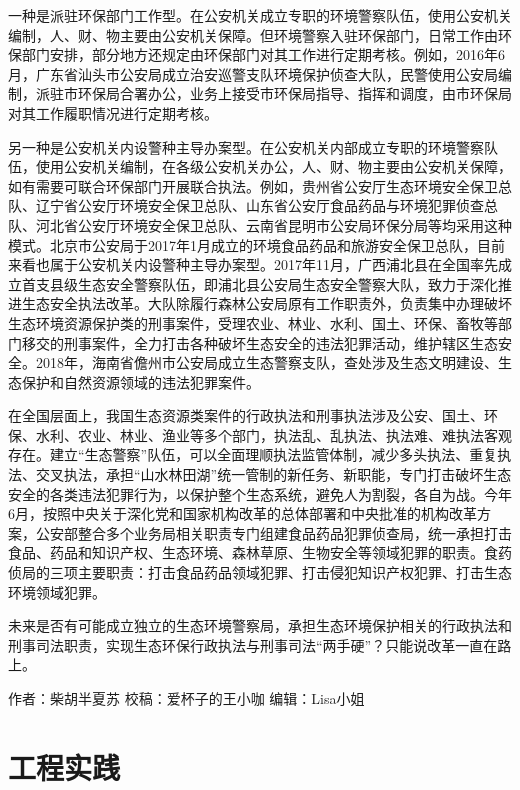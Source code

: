 \documentclass[]{book}
\begin{document}
一种是派驻环保部门工作型。在公安机关成立专职的环境警察队伍，使用公安机关编制，人、财、物主要由公安机关保障。但环境警察入驻环保部门，日常工作由环保部门安排，部分地方还规定由环保部门对其工作进行定期考核。例如，2016年6月，广东省汕头市公安局成立治安巡警支队环境保护侦查大队，民警使用公安局编制，派驻市环保局合署办公，业务上接受市环保局指导、指挥和调度，由市环保局对其工作履职情况进行定期考核。

另一种是公安机关内设警种主导办案型。在公安机关内部成立专职的环境警察队伍，使用公安机关编制，在各级公安机关办公，人、财、物主要由公安机关保障，如有需要可联合环保部门开展联合执法。例如，贵州省公安厅生态环境安全保卫总队、辽宁省公安厅环境安全保卫总队、山东省公安厅食品药品与环境犯罪侦查总队、河北省公安厅环境安全保卫总队、云南省昆明市公安局环保分局等均采用这种模式。北京市公安局于2017年1月成立的环境食品药品和旅游安全保卫总队，目前来看也属于公安机关内设警种主导办案型。2017年11月，广西浦北县在全国率先成立首支县级生态安全警察队伍，即浦北县公安局生态安全警察大队，致力于深化推进生态安全执法改革。大队除履行森林公安局原有工作职责外，负责集中办理破坏生态环境资源保护类的刑事案件，受理农业、林业、水利、国土、环保、畜牧等部门移交的刑事案件，全力打击各种破坏生态安全的违法犯罪活动，维护辖区生态安全。2018年，海南省儋州市公安局成立生态警察支队，查处涉及生态文明建设、生态保护和自然资源领域的违法犯罪案件。

在全国层面上，我国生态资源类案件的行政执法和刑事执法涉及公安、国土、环保、水利、农业、林业、渔业等多个部门，执法乱、乱执法、执法难、难执法客观存在。建立``生态警察''队伍，可以全面理顺执法监管体制，减少多头执法、重复执法、交叉执法，承担``山水林田湖''统一管制的新任务、新职能，专门打击破坏生态安全的各类违法犯罪行为，以保护整个生态系统，避免人为割裂，各自为战。今年6月，按照中央关于深化党和国家机构改革的总体部署和中央批准的机构改革方案，公安部整合多个业务局相关职责专门组建食品药品犯罪侦查局，统一承担打击食品、药品和知识产权、生态环境、森林草原、生物安全等领域犯罪的职责。食药侦局的三项主要职责：打击食品药品领域犯罪、打击侵犯知识产权犯罪、打击生态环境领域犯罪。

未来是否有可能成立独立的生态环境警察局，承担生态环境保护相关的行政执法和刑事司法职责，实现生态环保行政执法与刑事司法``两手硬''？只能说改革一直在路上。

作者：柴胡半夏苏
校稿：爱杯子的王小咖
编辑：Lisa小姐

\hypertarget{ux5de5ux7a0bux5b9eux8df5}{%
\chapter{工程实践}\label{ux5de5ux7a0bux5b9eux8df5}}
\end{document}
